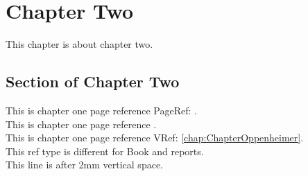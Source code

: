 \documentclass[a4paper, 10pt]{report}
\begin{document}
\chapter[Just Chapter Two]{Chapter Two}
This chapter is about chapter two.
\section{Section of Chapter Two}
This is chapter one page reference PageRef: \pageref{chap:ChapterOppenheimer}. \\
This is chapter one page reference . \\
This is chapter one page reference VRef: \vref{chap:ChapterOppenheimer}. \\
This ref type is different for Book and reports. \\[2mm]
This line is after 2mm vertical space. \\
\end{document}
